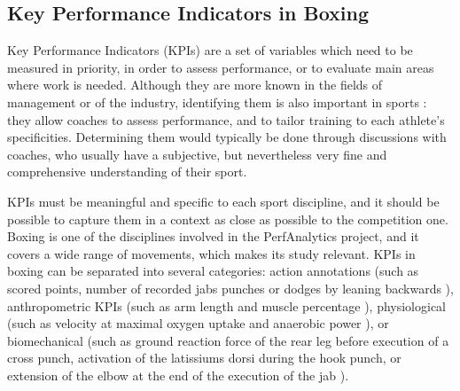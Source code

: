 \subsection{Key Performance Indicators in Boxing}

Key Performance Indicators (KPIs) are a set of variables which need to be measured in priority, in order to assess performance, or to evaluate main areas where work is needed. Although they are more known in the fields of management or of the industry, identifying them is also important in sports \cite{Hughes2002,Butterworth2013}: they allow coaches to assess performance, and to tailor training to each athlete's specificities. Determining them would typically be done through discussions with coaches, who usually have a subjective, but nevertheless very fine and comprehensive understanding of their sport. %


KPIs must be meaningful and specific to each sport discipline, and it should be possible to capture them in a context as close as possible to the competition one. Boxing is one of the disciplines involved in the PerfAnalytics project, and it covers a wide range of movements, which makes its study relevant. KPIs in boxing can be separated into several categories: action annotations (such as scored points, number of recorded jabs punches or dodges by leaning backwards \cite{Thomson2013}), anthropometric KPIs (such as arm length and muscle percentage \cite{Chaabene2015}), physiological (such as velocity at maximal oxygen uptake and anaerobic power \cite{Chaabene2015}), or biomechanical (such as ground reaction force of the rear leg before execution of a cross punch, activation of the latissiums dorsi during the hook punch, or extension of the elbow at the end of the execution of the jab \cite{Lenetsky2020}). 

